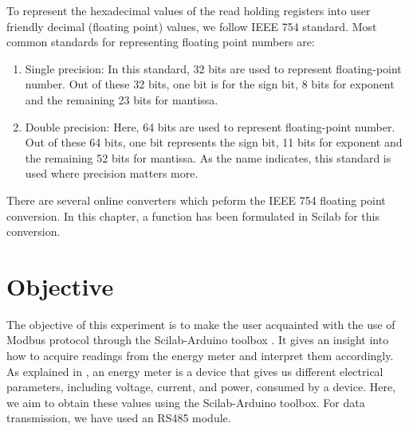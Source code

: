 

To represent the hexadecimal values of the read holding
registers into user friendly decimal (floating point) values, we
follow IEEE 754 standard. Most common standards for representing
floating point numbers are:
\begin{enumerate}
  \item Single precision: In this standard, 32 bits are used to represent floating-point number.
        Out of these 32 bits, one bit is for the sign bit, 8 bits for exponent and the remaining
        23 bits for mantissa.
  \item Double precision: Here, 64 bits are used to represent floating-point number.
        Out of these 64 bits, one bit represents the sign bit, 11 bits for exponent and the 
        remaining 52 bits for mantissa. As the name indicates, this standard is used where precision matters more.
\end{enumerate}
There are several online converters \cite{ieee-754-conv} which peform the
IEEE 754 floating point conversion. In this chapter, a function has been formulated in
Scilab for this conversion.   


\section{Objective}
The objective of this experiment is to make the user acquainted with
the use of Modbus protocol through the Scilab-Arduino toolbox \cite{modbus-paper}. 
It gives an insight into how to acquire readings from the energy meter and interpret them accordingly. As explained in , 
an energy meter is a device that gives us different electrical parameters, including voltage, current,
and power, consumed by a device. Here, we aim to obtain these values
using the Scilab-Arduino toolbox. For data transmission, we have used an
RS485 module.

